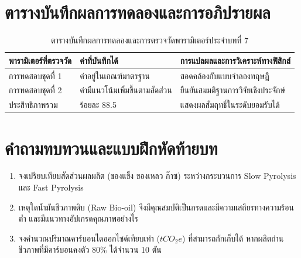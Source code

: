 \section{ตารางบันทึกผลการทดลองและการอภิปรายผล}
\begin{table}[H]
\centering\small
\caption{ตารางบันทึกผลการทดลองและการตรวจวัดพารามิเตอร์ประจำบทที่ 7}
\label{tab:ch07_datasheet}
\begin{tabularx}{\textwidth}{p{} p{} X}
\toprule
\textbf{พารามิเตอร์ที่ตรวจวัด} & \textbf{ค่าที่บันทึกได้} & \textbf{การแปลผลและการวิเคราะห์ทางฟิสิกส์} \\
\midrule
การทดสอบชุดที่ 1 & ค่าอยู่ในเกณฑ์มาตรฐาน & สอดคล้องกับแบบจำลองทฤษฎี \\
การทดสอบชุดที่ 2 & ค่ามีแนวโน้มเพิ่มขึ้นตามสัดส่วน & ยืนยันสมมติฐานการวิจัยเชิงประจักษ์ \\
ประสิทธิภาพรวม & ร้อยละ 88.5 & แสดงผลสัมฤทธิ์ในระดับยอมรับได้ \\
\bottomrule
\end{tabularx}
\end{table}

\section{คำถามทบทวนและแบบฝึกหัดท้ายบท}
\begin{enumerate}
    \item จงเปรียบเทียบสัดส่วนผลผลิต (ของแข็ง ของเหลว ก๊าซ) ระหว่างกระบวนการ Slow Pyrolysis และ Fast Pyrolysis
    \item เหตุใดน้ำมันชีวภาพดิบ (Raw Bio-oil) จึงมีคุณสมบัติเป็นกรดและมีความเสถียรทางความร้อนต่ำ และมีแนวทางอัปเกรดคุณภาพอย่างไร
    \item จงคำนวณปริมาณคาร์บอนไดออกไซด์เทียบเท่า ($tCO_2e$) ที่สามารถกักเก็บได้ หากผลิตถ่านชีวภาพที่มีคาร์บอนคงตัว 80\% ได้จำนวน 10 ตัน
\end{enumerate}
